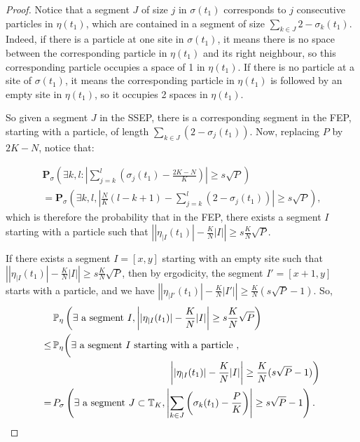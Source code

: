 \documentclass[10pt,a4paper]{amsart}
\newcommand{\PP}{\mathbb{P}}
\newcommand{\T}{\mathbb{T}}
\newcommand{\bP}{\textbf{P}}
\begin{document}
\begin{proof}
Notice that a segment $J$ of size $j$ in $\sigma(t_1)$ corresponds to $j$ consecutive particles in $\eta(t_1)$, which are contained in a segment of size $\sum_{k\in J} 2 - \sigma_k(t_1)$. Indeed, if there is a particle at one site in $\sigma(t_1)$, it means there is no space between the corresponding particle in $\eta(t_1)$ and its right neighbour, so this corresponding particle occupies a space of 1 in $\eta(t_1)$. If there is no particle at a site of $\sigma(t_1)$, it means the corresponding particle in $\eta(t_1)$ is followed by an empty site in $\eta(t_1)$, so it occupies 2 spaces in $\eta(t_1)$. 

So given a segment $J$ in the SSEP, there is a corresponding segment in the FEP, starting with a particle, of length $\sum_{k\in J} \left(2-\sigma_j(t_1)  \right)$. Now, replacing $P$ by $2K-N$, notice that:

\begin{multline}\bP_\sigma\left(\exists k, l : \left|\sum_{j=k}^{l} \left(\sigma_j(t_1) - \frac{2K-N}{K} \right) \right|\ge s\sqrt{P} \right) \\ = \bP_\sigma\left(\exists k, l, \left| \frac{N}{K}(l-k +1) - \sum_{j=k}^{l} \left(2 - \sigma_j(t_1)\right)\right| \ge s\sqrt{P}\right),
\end{multline}
which is  therefore the probability that in the FEP, there exists a segment $I$ starting with a particle such that $\left| |\eta_{|I}(t_1)| - \frac{K}{N} |I| \right| \ge s\frac{K}{N} \sqrt{P}$. 

If there exists a segment $I = [x,y]$ starting with an empty site
such that $\left| |\eta_{|I}(t_1)| - \frac{K}{N} |I| \right| \ge s \frac{K}{N}\sqrt{P}$, then by ergodicity, the segment $I' = [x+1, y]$ starts with a particle, and we have $\left| |\eta_{|I'}(t_1)| - \frac{K}{N} |I'| \right| \ge \frac{K}{N} (s\sqrt{P}-1)$. So, 
\begin{align}
&\,\PP_\eta\left(\exists \hbox{ a segment } I, \left| |\eta_{|I}(t_1)| - \frac{K}{N} |I| \right| \ge s\frac{K}{N} \sqrt{P}\right)
 \nonumber\\
\le &\,\PP_\eta\bigg(\exists \hbox{ a segment } I \hbox{ starting with a particle }, \nonumber\\
& \qquad\qquad\qquad\qquad\qquad\qquad \left| |\eta_{|I}(t_1)| - \frac{K}{N} |I| \right| \ge \frac{K}{N}(s\sqrt{P}-1)\bigg) \nonumber\\
=& \,\bP_\sigma\left(\exists \hbox{ a segment }J \subset \T_K, \left|\sum_{k\in J}\left(\sigma_k(t_1) - \frac{P}{K}\right)\right| \ge s\sqrt{P}-1\right).
 \end{align}

\end{proof}
\end{document}
